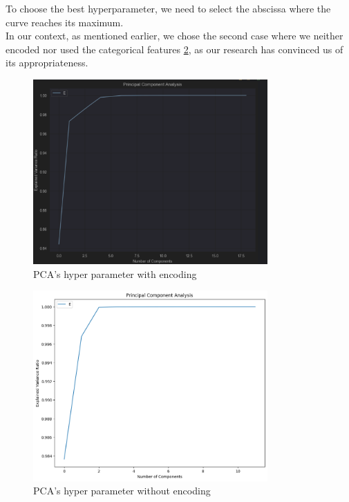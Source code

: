 \documentclass[a4paper,12pt]{article}
\begin{document}
To choose the best hyperparameter, we need to select the abscissa where the curve reaches its maximum.\\

In our context, as mentioned earlier, we chose the second case where we neither encoded nor used the categorical features \ref{fig:PCA_without_encode}, as our research has convinced us of its appropriateness.\\

\begin{figure}
  \centering
  \includegraphics[width=0.8\textwidth]{./images/PCA_analyze}
  \caption{PCA's hyper parameter with encoding}
  \label{fig:PCA_encode}
\end{figure}

\begin{figure}
  \centering
  \includegraphics[width=0.8\textwidth]{./images/PCA_analyze_without_encoding.png}
  \caption{PCA's hyper parameter without encoding}
  \label{fig:PCA_without_encode}
\end{figure}
\end{document}
